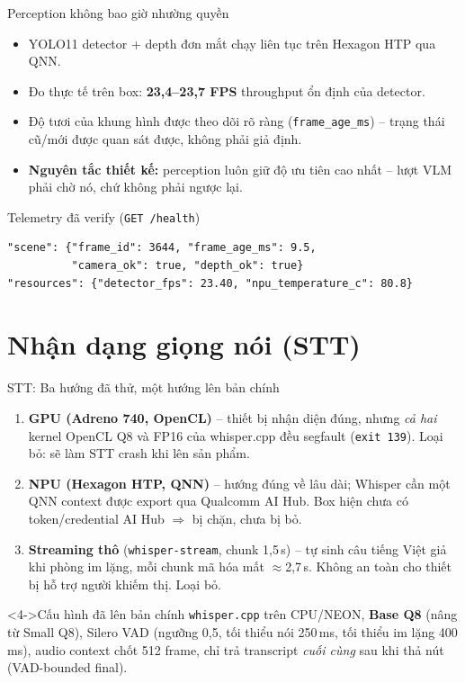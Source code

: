 \documentclass[aspectratio=169]{beamer}
\begin{document}
\begin{frame}[fragile]{Perception không bao giờ nhường quyền}
  \begin{itemize}
    \item YOLO11 detector + depth đơn mắt chạy liên tục trên Hexagon HTP qua QNN.
    \item Đo thực tế trên box: \textbf{23,4--23,7 FPS} throughput ổn định của detector.
    \item Độ tươi của khung hình được theo dõi rõ ràng (\texttt{frame\_age\_ms}) --
          trạng thái cũ/mới được quan sát được, không phải giả định.
    \item \textbf{Nguyên tắc thiết kế:} perception luôn giữ độ ưu tiên cao nhất --
          lượt VLM phải chờ nó, chứ không phải ngược lại.
  \end{itemize}
  \vspace{6pt}
  \begin{block}{Telemetry đã verify (\texttt{GET /health})}
\begin{lstlisting}
"scene": {"frame_id": 3644, "frame_age_ms": 9.5,
          "camera_ok": true, "depth_ok": true}
"resources": {"detector_fps": 23.40, "npu_temperature_c": 80.8}
\end{lstlisting}
  \end{block}
\end{frame}

\section{Nhận dạng giọng nói (STT)}

\begin{frame}{STT: Ba hướng đã thử, một hướng lên bản chính}
  \begin{enumerate}[<+->]
    \item \textbf{GPU (Adreno 740, OpenCL)} -- thiết bị nhận diện đúng, nhưng
          \emph{cả hai} kernel OpenCL Q8 và FP16 của whisper.cpp đều segfault
          (\texttt{exit 139}). Loại bỏ: sẽ làm STT crash khi lên sản phẩm.
    \item \textbf{NPU (Hexagon HTP, QNN)} -- hướng đúng về lâu dài; Whisper cần một
          QNN context được export qua Qualcomm AI Hub. Box hiện chưa có token/credential
          AI Hub $\Rightarrow$ bị chặn, chưa bị bỏ.
    \item \textbf{Streaming thô} (\texttt{whisper-stream}, chunk 1,5\,s) -- tự sinh câu
          tiếng Việt giả khi phòng im lặng, mỗi chunk mã hóa mất $\approx$2,7\,s.
          Không an toàn cho thiết bị hỗ trợ người khiếm thị. Loại bỏ.
  \end{enumerate}
  \begin{alertblock}<4->{Cấu hình đã lên bản chính}
    \texttt{whisper.cpp} trên CPU/NEON, \textbf{Base Q8} (nâng từ Small Q8),
    Silero VAD (ngưỡng 0,5, tối thiểu nói 250\,ms, tối thiểu im lặng 400\,ms),
    audio context chốt 512 frame, chỉ trả transcript \emph{cuối cùng} sau khi
    thả nút (VAD-bounded final).
  \end{alertblock}
\end{frame}
\end{document}
